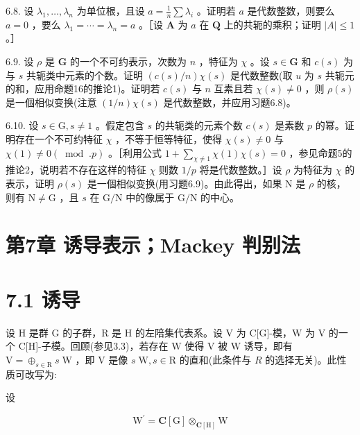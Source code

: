 \documentclass[10pt]{article}
\begin{document}
6.8. 设 \({\lambda }_{1},\ldots ,{\lambda }_{n}\) 为单位根，且设 \(a = \frac{1}{n}\sum {\lambda }_{i}\) 。证明若 \(a\) 是代数整数，则要么 \(a = 0\) ，要么 \({\lambda }_{1} = \cdots  = {\lambda }_{n} = a\) 。［设 \(\mathbf{A}\) 为 \(a\) 在 \(\mathbf{Q}\) 上的共轭的乘积；证明 \(\left| A\right|  \leq  1\) 。］

6.9. 设 \(\rho\) 是 \(\mathbf{G}\) 的一个不可约表示，次数为 \(n\) ，特征为 \(\chi\) 。设 \(s \in  \mathbf{G}\) 和 \(c\left( s\right)\) 为与 \(s\) 共轭类中元素的个数。证明 \(\left( {c\left( s\right) /n}\right) \chi \left( s\right)\) 是代数整数(取 \(u\) 为 \(s\) 共轭元的和，应用命题16的推论1)。证明若 \(c\left( s\right)\) 与 \(n\) 互素且若 \(\chi \left( s\right)  \neq  0\) ，则 \(\rho \left( s\right)\) 是一個相似变换(注意 \(\left( {1/n}\right) \chi \left( s\right)\) 是代数整数，并应用习题6.8)。

6.10. 设 \(s \in  \mathrm{G},s \neq  1\) 。假定包含 \(s\) 的共轭类的元素个数 \(c\left( s\right)\) 是素数 \(p\) 的幂。证明存在一个不可约特征 \(\chi\) ，不等于恒等特征，使得 \(\chi \left( s\right)  \neq  0\) 与 \(\chi \left( 1\right)  \neq  0\left( {\;\operatorname{mod}\;.p}\right)\) 。［利用公式 \(1 + \mathop{\sum }\limits_{{\chi  \neq  1}}\chi \left( 1\right) \chi \left( s\right)  = 0\) ，参见命题5的推论2，说明若不存在这样的特征 \(\chi\) 则数 \(1/p\) 将是代数整数。］设 \(\rho\) 为特征为 \(\chi\) 的表示，证明 \(\rho \left( s\right)\) 是一個相似变换(用习题6.9)。由此得出，如果 \(\mathrm{N}\) 是 \(\rho\) 的核，则有 \(\mathrm{N} \neq  \mathrm{G}\) ，且 \(s\) 在 \(\mathrm{G}/\mathrm{N}\) 中的像属于 \(\mathrm{G}/\mathrm{N}\) 的中心。

\section*{第7章 诱导表示；Mackey 判别法}

\section*{7.1 诱导}

设 H 是群 G 的子群，R 是 H 的左陪集代表系。设 V 为 C[G]-模，W 为 V 的一个 C[H]-子模。回顾(参见3.3)，若存在 \(\mathrm{W}\) 使得 V 被 \(\mathrm{W}\) 诱导，即有 \(\mathrm{V} = { \oplus  }_{s \in  \mathrm{R}}s\mathrm{\;W}\) ，即 \(\mathrm{V}\) 是像 \(s\mathrm{\;W},s \in  \mathrm{R}\) 的直和(此条件与 \(R\) 的选择无关)。此性质可改写为:

设

\[
{\mathrm{W}}^{\prime } = \mathbf{C}\left\lbrack  \mathrm{G}\right\rbrack  { \otimes  }_{\mathbf{C}\left\lbrack  \mathrm{H}\right\rbrack  }\mathrm{W}
\]
\end{document}
